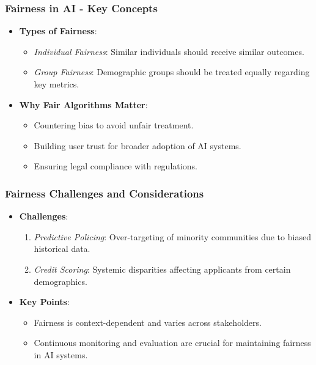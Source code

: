 \documentclass[aspectratio=169]{beamer}
\begin{document}
\begin{frame}[fragile]
    \frametitle{Fairness in AI - Key Concepts}
    \begin{itemize}
        \item \textbf{Types of Fairness}:
        \begin{itemize}
            \item \textit{Individual Fairness}: Similar individuals should receive similar outcomes.
            \item \textit{Group Fairness}: Demographic groups should be treated equally regarding key metrics.
        \end{itemize}
        \item \textbf{Why Fair Algorithms Matter}:
        \begin{itemize}
            \item Countering bias to avoid unfair treatment.
            \item Building user trust for broader adoption of AI systems.
            \item Ensuring legal compliance with regulations.
        \end{itemize}
    \end{itemize}
\end{frame}

\begin{frame}[fragile]
    \frametitle{Fairness Challenges and Considerations}
    \begin{itemize}
        \item \textbf{Challenges}:
        \begin{enumerate}
            \item \textit{Predictive Policing}: Over-targeting of minority communities due to biased historical data.
            \item \textit{Credit Scoring}: Systemic disparities affecting applicants from certain demographics.
        \end{enumerate}
        \item \textbf{Key Points}:
        \begin{itemize}
            \item Fairness is context-dependent and varies across stakeholders.
            \item Continuous monitoring and evaluation are crucial for maintaining fairness in AI systems.
        \end{itemize}
    \end{itemize}
\end{frame}
\end{document}
